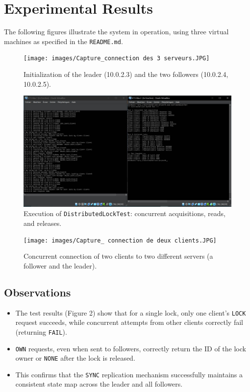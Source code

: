 \documentclass[a4paper,11pt]{article}
\begin{document}
\section{Experimental Results}
The following figures illustrate the system in operation, using three virtual machines as specified in the \texttt{README.md}.

\begin{figure}[H]
\centering
\texttt{[image: images/Capture\_connection des 3 serveurs.JPG]}
\caption{Initialization of the leader (10.0.2.3) and the two followers (10.0.2.4, 10.0.2.5).}
\end{figure}

\begin{figure}[H]
\centering
\includegraphics[width=0.9\linewidth]{images/Capture_distributed_lock_test.JPG}
\caption{Execution of \texttt{DistributedLockTest}: concurrent acquisitions, reads, and releases.}
\end{figure}

\begin{figure}[H]
\centering
\texttt{[image: images/Capture\_ connection de deux clients.JPG]}
\caption{Concurrent connection of two clients to two different servers (a follower and the leader).}
\end{figure}

\subsection*{Observations}
\begin{itemize}
    \item The test results (Figure 2) show that for a single lock, only one client's \texttt{LOCK} request succeeds, while concurrent attempts from other clients correctly fail (returning \texttt{FAIL}).
    \item \texttt{OWN} requests, even when sent to followers, correctly return the ID of the lock owner or \texttt{NONE} after the lock is released.
    \item This confirms that the \texttt{SYNC} replication mechanism successfully maintains a consistent state map across the leader and all followers.
\end{itemize}
\end{document}
